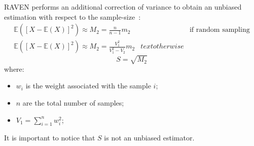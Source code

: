 RAVEN performs an additional correction of variance to obtain an unbiased estimation  with respect to the sample-size~\cite{RimoldiniUnbiased}:
\begin{equation}
\begin{matrix}
\mathbb{E}\left(\left[X - \mathbb{E}(X)\right]^{2}\right)  \approx M_{2} = \displaystyle \frac{n}{n-1}m_{2} & & \text{if random sampling}
\\
\mathbb{E}\left(\left[X - \mathbb{E}(X)\right]^{2}\right)  \approx M_{2} = \frac{V_{1}^{2}}{V_{1}^{2} - V_{2}}m_{2} &  text{otherwise}
\end{matrix}
\end{equation}
\begin{equation}
S = \sqrt{M_{2}} 
\end{equation}
where:
\begin{itemize}
  \item $w_{i}$ is the weight associated with the sample $i$;
  \item $n$ are the total number of samples;
  \item $V_{1} = \sum_{i=1}^{n} w_{i}^{2}$;
\end{itemize}
It is important to notice that $S$ is not an unbiased estimator.

